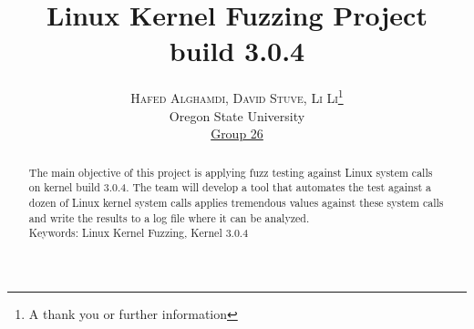 \documentclass[twoside]{article}
\title{\vspace{-15mm}\fontsize{24pt}{10pt}\selectfont\textbf{Linux Kernel Fuzzing Project}
\fontsize{15pt}{6pt}\selectfont\textbf {
\\ build 3.0.4}
} %
\author{
\large
\textsc{Hafed Alghamdi, David Stuve,  Li Li}\thanks{A thank you or further information}\\[2mm] %
\normalsize Oregon State University \\ %
\normalsize \href{mailto:alghamha@onid.oregonstate.edu, stuved@onid.oregonstate.edu, lil4@onid.oregonstate.edu}{Group 26} %
\vspace{-5mm}
}
\date{}
\begin{document}
\maketitle %

\thispagestyle{fancy} %


\begin{abstract}

The main objective of this project is applying fuzz testing against Linux system calls on kernel build 3.0.4. The team will develop a tool that automates the test against a dozen of Linux kernel system calls applies tremendous values against these system calls and write the results to a log file where it can be analyzed.\\
Keywords: Linux Kernel Fuzzing, Kernel 3.0.4



\end{abstract}

\end{document}

